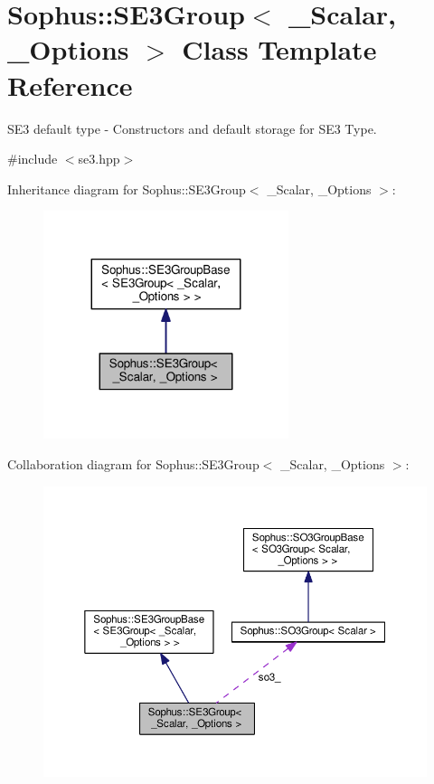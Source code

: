 \hypertarget{class_sophus_1_1_s_e3_group}{}\section{Sophus\+:\+:S\+E3\+Group$<$ \+\_\+\+Scalar, \+\_\+\+Options $>$ Class Template Reference}
\label{class_sophus_1_1_s_e3_group}


S\+E3 default type -\/ Constructors and default storage for S\+E3 Type.  




{\ttfamily \#include $<$se3.\+hpp$>$}



Inheritance diagram for Sophus\+:\+:S\+E3\+Group$<$ \+\_\+\+Scalar, \+\_\+\+Options $>$\+:
\nopagebreak
\begin{figure}[H]
\begin{center}
\leavevmode
\includegraphics[width=203pt]{class_sophus_1_1_s_e3_group__inherit__graph}
\end{center}
\end{figure}


Collaboration diagram for Sophus\+:\+:S\+E3\+Group$<$ \+\_\+\+Scalar, \+\_\+\+Options $>$\+:
\nopagebreak
\begin{figure}[H]
\begin{center}
\leavevmode
\includegraphics[width=350pt]{class_sophus_1_1_s_e3_group__coll__graph}
\end{center}
\end{figure}
